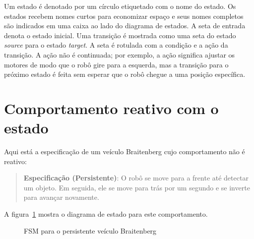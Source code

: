 Um estado é denotado por um círculo etiquetado com o nome do estado. Os estados recebem nomes curtos para economizar espaço e seus nomes completos são indicados em uma caixa ao lado do diagrama de estados. A seta de entrada denota o estado inicial. Uma transição é mostrada como uma seta do estado \emph{source} para o estado \emph{target}. A seta é rotulada com a condição e a ação da transição. A ação não é continuada; por exemplo, a ação  significa ajustar os motores de modo que o robô gire para a esquerda, mas a transição para o próximo estado é feita sem esperar que o robô chegue a uma posição específica.

\section{Comportamento reativo com o estado}\label{s.reactive-state}

Aqui está a especificação de um veículo Braitenberg cujo comportamento não é reativo:

\begin{quote}
\normalsize\noindent\textbf{Especificação (Persistente)}: O robô se move para a frente até detectar um objeto. Em seguida, ele se move para trás por um segundo e se inverte para avançar novamente.
\end{quote}
A figura~\ref{fig.persistent} mostra o diagrama de estado para este comportamento.

\begin{figure}
\begin{center}
\caption{FSM para o persistente veículo Braitenberg}\label{fig.persistent}
\end{center}
\end{figure}

